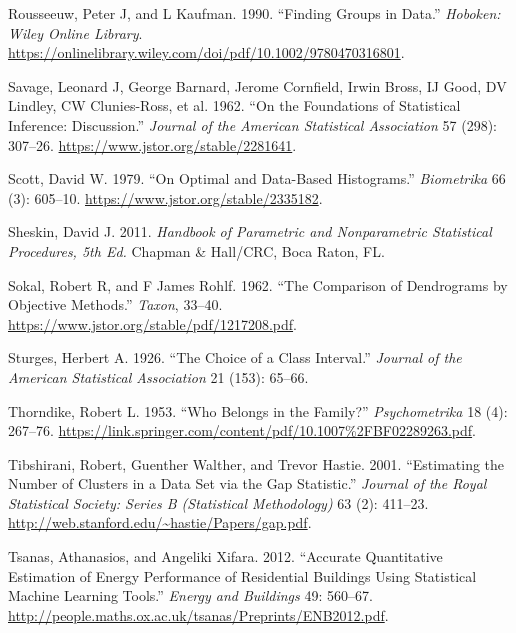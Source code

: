 \documentclass[
]{book}
\newlength{\cslhangindent}
\newenvironment{cslreferences}%
  {\setlength{\parindent}{0pt}%
  \everypar{\setlength{\hangindent}{\cslhangindent}}\ignorespaces}%
  {\par}
\theoremstyle{definition}
\theoremstyle{definition}
\theoremstyle{definition}
\theoremstyle{remark}
\begin{document}
\begin{cslreferences}
\leavevmode\hypertarget{ref-rousseeuw1990finding}{}%
Rousseeuw, Peter J, and L Kaufman. 1990. ``Finding Groups in Data.'' \emph{Hoboken: Wiley Online Library}. \url{https://onlinelibrary.wiley.com/doi/pdf/10.1002/9780470316801}.

\leavevmode\hypertarget{ref-savage1962foundations}{}%
Savage, Leonard J, George Barnard, Jerome Cornfield, Irwin Bross, IJ Good, DV Lindley, CW Clunies-Ross, et al. 1962. ``On the Foundations of Statistical Inference: Discussion.'' \emph{Journal of the American Statistical Association} 57 (298): 307--26. \url{https://www.jstor.org/stable/2281641}.

\leavevmode\hypertarget{ref-scott1979optimal}{}%
Scott, David W. 1979. ``On Optimal and Data-Based Histograms.'' \emph{Biometrika} 66 (3): 605--10. \url{https://www.jstor.org/stable/2335182}.

\leavevmode\hypertarget{ref-sheskin2011handbook}{}%
Sheskin, David J. 2011. \emph{Handbook of Parametric and Nonparametric Statistical Procedures, 5th Ed.} Chapman \& Hall/CRC, Boca Raton, FL.

\leavevmode\hypertarget{ref-sokal1962comparison}{}%
Sokal, Robert R, and F James Rohlf. 1962. ``The Comparison of Dendrograms by Objective Methods.'' \emph{Taxon}, 33--40. \url{https://www.jstor.org/stable/pdf/1217208.pdf}.

\leavevmode\hypertarget{ref-sturges1926choice}{}%
Sturges, Herbert A. 1926. ``The Choice of a Class Interval.'' \emph{Journal of the American Statistical Association} 21 (153): 65--66.

\leavevmode\hypertarget{ref-thorndike1953belongs}{}%
Thorndike, Robert L. 1953. ``Who Belongs in the Family?'' \emph{Psychometrika} 18 (4): 267--76. \url{https://link.springer.com/content/pdf/10.1007\%2FBF02289263.pdf}.

\leavevmode\hypertarget{ref-tibshirani2001estimating}{}%
Tibshirani, Robert, Guenther Walther, and Trevor Hastie. 2001. ``Estimating the Number of Clusters in a Data Set via the Gap Statistic.'' \emph{Journal of the Royal Statistical Society: Series B (Statistical Methodology)} 63 (2): 411--23. \url{http://web.stanford.edu/~hastie/Papers/gap.pdf}.

\leavevmode\hypertarget{ref-tsanas2012accurate}{}%
Tsanas, Athanasios, and Angeliki Xifara. 2012. ``Accurate Quantitative Estimation of Energy Performance of Residential Buildings Using Statistical Machine Learning Tools.'' \emph{Energy and Buildings} 49: 560--67. \url{http://people.maths.ox.ac.uk/tsanas/Preprints/ENB2012.pdf}.


\end{cslreferences}
\end{document}
